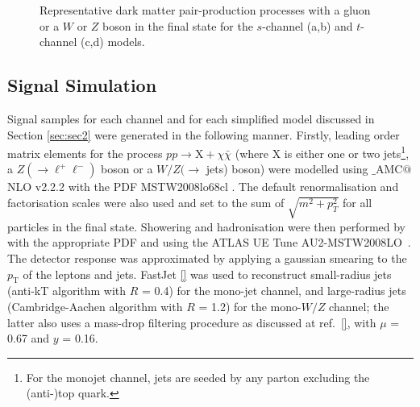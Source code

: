 \begin{figure}[t]
\begin{subfigure}[b]{0.4\textwidth}
{
    }
    \caption{}
  \end{subfigure}
  \hspace{1cm}
  \begin{subfigure}[b]{0.4\textwidth}
    \centering
    \caption{}
  \end{subfigure}
  \caption{Representative dark matter pair-production processes with a gluon or a $W$ or $Z$ boson in the final state for the $s$-channel (a,b) and $t$-channel (c,d) models.}
  \label{allchannel_sig_phen}
\end{figure}

\subsection{Signal Simulation}
\label{signal_generation}
Signal samples for each channel and for each simplified model discussed in Section \ref{sec:sec2} were generated in the following manner. Firstly, leading order matrix elements for the process $pp \rightarrow \mathrm{X} + \chi\bar{\chi}$ (where X is either one or two jets\footnote{For the monojet channel, jets are seeded by any parton excluding the (anti-)top quark.}, a $Z(\rightarrow \ell^+ \ell^-)$ boson or a $W/Z(\rightarrow$ jets) boson) were modelled using \MG$\_${\footnotesize A}MC$@$NLO v2.2.2 \cite{MG_aMCNLO2014} with the PDF MSTW2008lo68cl \cite{MSTW}. The default renormalisation and factorisation scales were also used and set to the sum of $\sqrt{m^{2} + p_{T}^{2}}$ for all particles in the final state. Showering and hadronisation were then performed by  with the appropriate PDF and using the ATLAS UE Tune AU2-MSTW2008LO~\cite{AUtune}. The detector response was approximated by applying a gaussian smearing to the $p_{\mathrm{T}}$ of the leptons and jets. FastJet \ref{} was used to reconstruct small-radius jets (anti-kT algorithm with $R$ = 0.4) for the mono-jet channel, and large-radius jets (Cambridge-Aachen algorithm with $R$ = 1.2) for the mono-$W/Z$ channel; the latter also uses a mass-drop filtering procedure as discussed at ref.~\ref{}, with $\mu$ = 0.67 and $y$ = 0.16.

